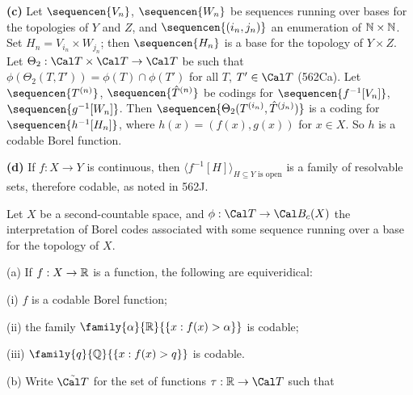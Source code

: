 {\medskip

{\bf (c)} Let $\sequencen{V_n}$, $\sequencen{W_n}$ be sequences running
over bases for the topologies of $Y$ and $Z$, and
$\sequencen{(i_n,j_n)}$ an enumeration of $\Bbb N\times\Bbb N$.
Set $H_n=V_{i_n}\times W_{j_n}$;  then $\sequencen{H_n}$ is a base for the
topology of $Y\times Z$.
Let $\Theta_2:\Cal T\times\Cal T\to\Cal T$ be such that
$\phi(\Theta_2(T,T'))=\phi(T)\cap\phi(T')$ for all $T$, $T'\in\Cal T$
(562Ca).   Let $\sequencen{T^{(n)}}$, $\sequencen{\hat T^{(n)}}$ be codings for
$\sequencen{f^{-1}[V_n]}$, $\sequencen{g^{-1}[W_n]}$.   Then
$\sequencen{\Theta_2(T^{(i_n)},\hat T^{(j_n)})}$ is a coding for
$\sequencen{h^{-1}[H_n]}$, where $h(x)=(f(x),g(x))$ for $x\in X$.
So $h$ is a codable Borel function.

\medskip

{\bf (d)} If $f:X\to Y$ is continuous, then
$\langle f^{-1}[H]\rangle_{H\subseteq Y\text{ is open}}$ is a family of
resolvable sets, therefore codable, as noted in 562J.
}%


 Let $X$ be a second-countable space,
and $\phi:\Cal T\to\Cal B_c(X)$ the interpretation of Borel codes
associated with some sequence running over a base for the topology of $X$.

(a) If $f:X\to\Bbb R$ is a function, the following are equiveridical:

\quad(i) $f$ is a codable Borel function;

\quad(ii) the family
$\family{\alpha}{\Bbb R}{\{x:f(x)>\alpha\}}$ is codable;

\quad(iii)
$\family{q}{\Bbb Q}{\{x:f(x)>q\}}$ is codable.

(b) Write $\tilde{\Cal T}$ for the set of
functions $\tau:\Bbb R\to\Cal T$ such that



